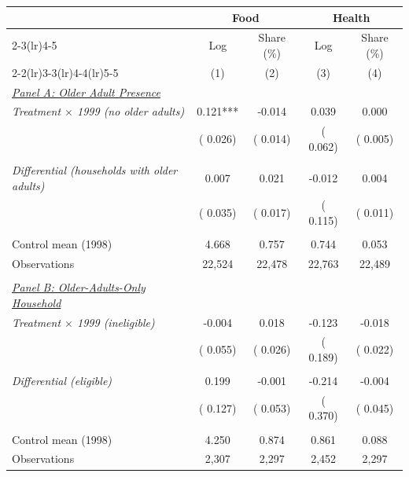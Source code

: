 \begin{tabular}{lcccc} \hline \hline
& \multicolumn{2}{c}{Food} & \multicolumn{2}{c}{Health} \\ 
\cmidrule(lr){2-3}\cmidrule(lr){4-5}
& \multicolumn{1}{c}{Log} & \multicolumn{1}{c}{Share (\%)} & \multicolumn{1}{c}{Log} & \multicolumn{1}{c}{Share (\%)} \\ 
\cmidrule(lr){2-2}\cmidrule(lr){3-3}\cmidrule(lr){4-4}\cmidrule(lr){5-5}
& \multicolumn{1}{c}{(1)} & \multicolumn{1}{c}{(2)} & \multicolumn{1}{c}{(3)} & \multicolumn{1}{c}{(4)} \\ \toprule
\underline{\textit{Panel A: Older Adult Presence}} \\ 
\textit{Treatment $\times$ 1999 (no older adults)} & 0.121*** & -0.014 & 0.039 & 0.000 \\ 
 & (    0.026) & (    0.014) & (    0.062) & (    0.005) \\ 
  & & & & \\ 
\textit{Differential (households with older adults)} & 0.007 & 0.021 & -0.012 & 0.004 \\ 
 & (    0.035) & (    0.017) & (    0.115) & (    0.011) \\ 
  & & & & \\ 
Control mean (1998) &     4.668 &     0.757 &     0.744 &     0.053 \\ 
Observations &       22,524 &       22,478 &       22,763 &       22,489 \\ 
  & & & & \\ 
\underline{\textit{Panel B: Older-Adults-Only Household}} \\ 
\textit{Treatment $\times$ 1999 (ineligible)} & -0.004 & 0.018 & -0.123 & -0.018 \\ 
 & (    0.055) & (    0.026) & (    0.189) & (    0.022) \\ 
  & & & & \\ 
\textit{Differential (eligible)} & 0.199 & -0.001 & -0.214 & -0.004 \\ 
 & (    0.127) & (    0.053) & (    0.370) & (    0.045) \\ 
  & & & & \\ 
Control mean (1998) &     4.250 &     0.874 &     0.861 &     0.088 \\ 
Observations &        2,307 &        2,297 &        2,452 &        2,297 \\ \bottomrule
\end{tabular}